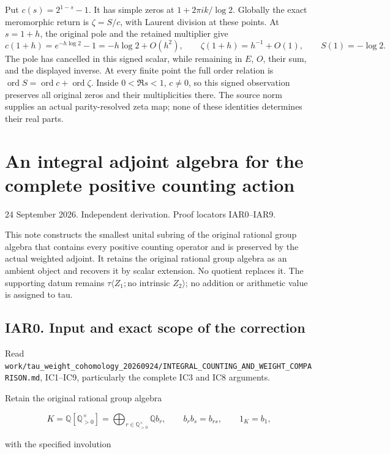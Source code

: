\documentclass[
]{article}
\newcounter{none} %
\begin{document}
Put \(c(s)=2^{1-s}-1\). It has simple zeros at \(1+2\pi i k/\log2\).
Globally the exact meromorphic return is \(\zeta=S/c\), with Laurent
division at these points. At \(s=1+h\), the original pole and the
retained multiplier give \[
c(1+h)=e^{-h\log2}-1=-h\log2+O(h^2),\qquad
\zeta(1+h)=h^{-1}+O(1),\qquad S(1)=-\log2.
\tag{PRZ4.3}
\] The pole has cancelled in this signed scalar, while remaining in
\(E\), \(O\), their sum, and the displayed inverse. At every finite
point the full order relation is
\(\operatorname{ord}S=\operatorname{ord}c+\operatorname{ord}\zeta\).
Inside \(0<\Re s<1\), \(c\ne0\), so this signed observation preserves
all original zeros and their multiplicities there. The source norm
supplies an actual parity-resolved zeta map; none of these identities
determines their real parts.

\section{An integral adjoint algebra for the complete positive counting
action}\label{an-integral-adjoint-algebra-for-the-complete-positive-counting-action}

24 September 2026. Independent derivation. Proof locators IAR0--IAR9.

This note constructs the smallest unital subring of the original
rational group algebra that contains every positive counting operator
and is preserved by the actual weighted adjoint. It retains the original
rational group algebra as an ambient object and recovers it by scalar
extension. No quotient replaces it. The supporting datum remains
\(\tau\langle Z_1;\text{no intrinsic }Z_2\rangle\); no addition or
arithmetic value is assigned to tau.

\subsection{IAR0. Input and exact scope of the
correction}\label{iar0.-input-and-exact-scope-of-the-correction}

Read
\nolinkurl{work/tau_weight_cohomology_20260924/INTEGRAL_COUNTING_AND_WEIGHT_COMPARISON.md},
IC1--IC9, particularly the complete IC3 and IC8 arguments.

Retain the original rational group algebra

\[
K=\mathbb Q[\mathbb Q_{>0}^{\times}]
=\bigoplus_{r\in\mathbb Q_{>0}^{\times}}\mathbb Q b_r,
\qquad b_rb_s=b_{rs},\qquad 1_K=b_1,
\tag{IAR0.1}
\]

with the specified involution
\end{document}
